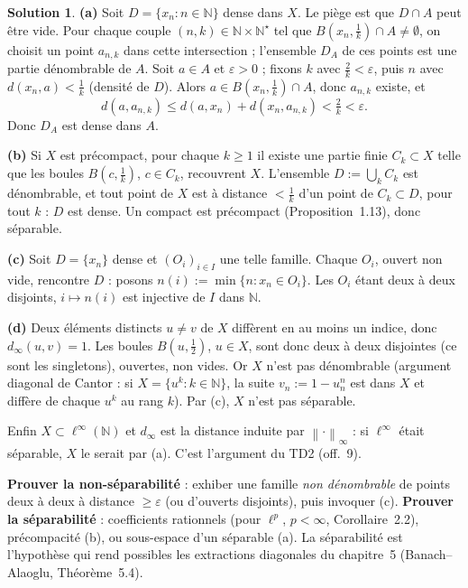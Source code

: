 \documentclass[11pt,a4paper]{article}
\newcommand{\N}{\mathbb{N}}
\newcommand{\norm}[1]{\left\|#1\right\|}
\theoremstyle{definition}
\newtheorem*{solution}{Solution}
\begin{document}
\begin{solution}
\noindent\textbf{(a)} Soit $D=\{x_n:n\in\N\}$ dense dans $X$. Le piège est que $D\cap A$ peut être vide. Pour chaque couple $(n,k)\in\N\times\N^\star$ tel que $B(x_n,\frac1k)\cap A\ne\emptyset$, on choisit un point $a_{n,k}$ dans cette intersection ; l'ensemble $D_A$ de ces points est une partie dénombrable de $A$. Soit $a\in A$ et $\varepsilon>0$ ; fixons $k$ avec $\frac2k<\varepsilon$, puis $n$ avec $d(x_n,a)<\frac1k$ (densité de $D$). Alors $a\in B(x_n,\frac1k)\cap A$, donc $a_{n,k}$ existe, et
\[
d(a,a_{n,k})\le d(a,x_n)+d(x_n,a_{n,k})<\tfrac2k<\varepsilon .
\]
Donc $D_A$ est dense dans $A$.

\medskip
\noindent\textbf{(b)} Si $X$ est précompact, pour chaque $k\ge1$ il existe une partie finie $C_k\subset X$ telle que les boules $B(c,\frac1k)$, $c\in C_k$, recouvrent $X$. L'ensemble $D:=\bigcup_kC_k$ est dénombrable, et tout point de $X$ est à distance $<\frac1k$ d'un point de $C_k\subset D$, pour tout $k$ : $D$ est dense. Un compact est précompact (Proposition~1.13), donc séparable.

\medskip
\noindent\textbf{(c)} Soit $D=\{x_n\}$ dense et $(O_i)_{i\in I}$ une telle famille. Chaque $O_i$, ouvert non vide, rencontre $D$ : posons $n(i):=\min\{n:x_n\in O_i\}$. Les $O_i$ étant deux à deux disjoints, $i\mapsto n(i)$ est injective de $I$ dans $\N$.

\medskip
\noindent\textbf{(d)} Deux éléments distincts $u\ne v$ de $X$ diffèrent en au moins un indice, donc $d_\infty(u,v)=1$. Les boules $B(u,\frac12)$, $u\in X$, sont donc deux à deux disjointes (ce sont les singletons), ouvertes, non vides. Or $X$ n'est pas dénombrable (argument diagonal de Cantor : si $X=\{u^k:k\in\N\}$, la suite $v_n:=1-u^n_n$ est dans $X$ et diffère de chaque $u^k$ au rang $k$). Par (c), $X$ n'est pas séparable.

Enfin $X\subset\ell^\infty(\N)$ et $d_\infty$ est la distance induite par $\norm\cdot_\infty$ : si $\ell^\infty$ était séparable, $X$ le serait par (a). C'est l'argument du TD2 (off.~9).
\end{solution}

\begin{methode}
\textbf{Prouver la non-séparabilité} : exhiber une famille \emph{non dénombrable} de points deux à deux à distance $\ge\varepsilon$ (ou d'ouverts disjoints), puis invoquer (c). \textbf{Prouver la séparabilité} : coefficients rationnels (pour $\ell^p$, $p<\infty$, Corollaire~2.2), précompacité (b), ou sous-espace d'un séparable (a). La séparabilité est l'hypothèse qui rend possibles les extractions diagonales du chapitre~5 (Banach--Alaoglu, Théorème~5.4).
\end{methode}
\end{document}
